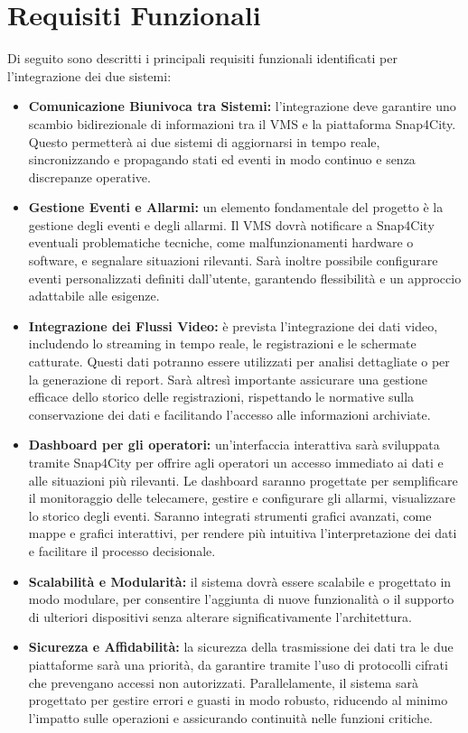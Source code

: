 \documentclass[a4paper, openright, thesis]{report}
\begin{document}
\section{Requisiti Funzionali}

Di seguito sono descritti i principali requisiti funzionali identificati per l’integrazione dei due sistemi:

\begin{itemize}
    \item \textbf{Comunicazione Biunivoca tra Sistemi:} l’integrazione deve garantire uno scambio bidirezionale di informazioni tra il VMS e la piattaforma Snap4City. Questo permetterà ai due sistemi di aggiornarsi in tempo reale, sincronizzando e propagando stati ed eventi in modo continuo e senza discrepanze operative.

    \item \textbf{Gestione Eventi e Allarmi:} un elemento fondamentale del progetto è la gestione degli eventi e degli allarmi. Il VMS dovrà notificare a Snap4City eventuali problematiche tecniche, come malfunzionamenti hardware o software, e segnalare situazioni rilevanti. Sarà inoltre possibile configurare eventi personalizzati definiti dall’utente, garantendo flessibilità e un approccio adattabile alle esigenze.

    \item \textbf{Integrazione dei Flussi Video:} è prevista l’integrazione dei dati video, includendo lo streaming in tempo reale, le registrazioni e le schermate catturate. Questi dati potranno essere utilizzati per analisi dettagliate o per la generazione di report. Sarà altresì importante assicurare una gestione efficace dello storico delle registrazioni, rispettando le normative sulla conservazione dei dati e facilitando l’accesso alle informazioni archiviate.

    \item \textbf{Dashboard per gli operatori:} un’interfaccia interattiva sarà sviluppata tramite Snap4City per offrire agli operatori un accesso immediato ai dati e alle situazioni più rilevanti. Le dashboard saranno progettate per semplificare il monitoraggio delle telecamere, gestire e configurare gli allarmi, visualizzare lo storico degli eventi. Saranno integrati strumenti grafici avanzati, come mappe e grafici interattivi, per rendere più intuitiva l’interpretazione dei dati e facilitare il processo decisionale.

    \item \textbf{Scalabilità e Modularità:} il sistema dovrà essere scalabile e progettato in modo modulare, per consentire l’aggiunta di nuove funzionalità o il supporto di ulteriori dispositivi senza alterare significativamente l’architettura.

    \item \textbf{Sicurezza e Affidabilità:} la sicurezza della trasmissione dei dati tra le due piattaforme sarà una priorità, da garantire tramite l’uso di protocolli cifrati che prevengano accessi non autorizzati. Parallelamente, il sistema sarà progettato per gestire errori e guasti in modo robusto, riducendo al minimo l’impatto sulle operazioni e assicurando continuità nelle funzioni critiche.
    
\end{itemize}
\end{document}
